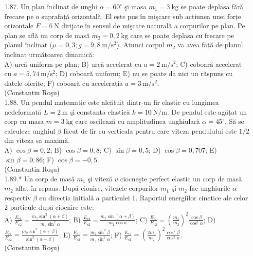 1.87. Un plan înclinat de unghi $\alpha=60^{\circ}$ şi masa $m_{1}=3 \mathrm{~kg}$ se poate deplasa fără frecare pe o suprafață orizontală. El este pus în mişcare sub acțiunea unei forțe orizontale $F=6 \mathrm{~N}$ dirijate în sensul de mişcare naturală a corpurilor pe plan. Pe plan se află un corp de masă $m_{2}=0,2 \mathrm{~kg}$ care se poate deplasa cu frecare pe planul înclinat ($\mu=0,3 ; g=9,8 \mathrm{~m} / \mathrm{s}^{2}$). Atunci corpul $m_{2}$ va avea față de planul înclinat următoarea dinamică:\\ A) urcă uniform pe plan; B) urcă accelerat cu $a=2 \mathrm{~m} / \mathrm{s}^{2}$; C) coboară accelerat cu $a=5,74 \mathrm{~m} / \mathrm{s}^{2}$; D) coboară uniform; E) nu se poate da nici un răspuns cu datele oferite; F) coboară cu accelerația $a=3 \mathrm{~m} / \mathrm{s}^{2}$.\\ (Constantin Roşu)\\

1.88. Un pendul matematic este alcătuit dintr-un fir elastic cu lungimea nedeformată $L=2 \mathrm{~m}$ şi constanta elastică $k=10 \mathrm{~N} / \mathrm{m}$. De pendul este agățat un corp cu masa $m=3 \mathrm{~kg}$ care oscilează cu amplitudinea unghiulară $\alpha=45^{\circ}$. Să se calculeze unghiul $\beta$ făcut de fir cu verticala pentru care viteza pendulului este $1 / 2$ din viteza sa maximă.\\ A) $\cos \beta=0,2$; B) $\cos \beta=0,8$; C) $\sin \beta=0,5$; D) $\cos \beta=0,707$; E) $\sin \beta=0,86$; F) $\cos \beta=-0,5$.\\ (Constantin Roşu)\\

1.89.* Un corp de masă $m_{1}$ şi viteză $v$ ciocneşte perfect elastic un corp de masă $m_{2}$ aflat în repaus. După cionire, vitezele corpurilor $m_{1}$ şi $m_{2}$ fac unghiurile $\alpha$ respectiv $\beta$ cu direcția inițialǎ a particulei 1. Raportul energiilor cinetice ale celor 2 particule după ciocnire este:\\ A) $\frac{E_{c 1}}{E_{c 2}}=\frac{m_{1} \sin ^{2}(\alpha+\beta)}{m_{2} \sin ^{2} \alpha}$; B) $\frac{E_{c 1}}{E_{c 2}}=\frac{m_{2} \sin (\alpha+\beta)}{m_{1} \cos \alpha}$; C) $\frac{E_{c 1}}{E_{c 2}}=\left(\frac{m_{1}}{m_{2}}\right)^{2} \frac{\cos \beta}{\cos ^{2} \alpha}$; D) $\frac{E_{c 1}}{E_{c 2}}=\frac{m_{2} \sin ^{2}(\alpha+\beta)}{\sin ^{2}(\alpha-\beta)}$; E) $\frac{E_{c 1}}{E_{c 2}}=\frac{m_{2} \sin ^{2} \beta}{m_{1} \sin ^{2} \alpha}$; F) $\frac{E_{c 1}}{E_{c 2}}=\left(\frac{2 m_{1}}{m_{2}}\right)^{2} \frac{\cos ^{2} \beta}{\cos ^{2} \alpha}$.\\ (Constantin Roşu)\\

